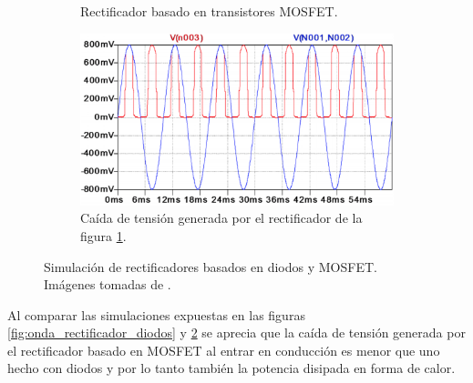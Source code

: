 \begin{figure}[h!]
\begin{subfigure}{.5\textwidth}
		\caption{Rectificador basado en transistores MOSFET.}
		\label{fig:rect_MOSFET}
	\end{subfigure}
	\begin{subfigure}{.5\textwidth}
		\centering
		\includegraphics[width=.8\linewidth]{Figures/onda_passive_mosfet_rectifier}  
		\caption{Caída de tensión generada por el rectificador de la figura \ref{fig:rect_MOSFET}.}
		\label{fig:onda_rectificador_MOSFET}
	\end{subfigure}
	\caption{Simulación de rectificadores basados en diodos y MOSFET. Imágenes tomadas de \citep{Yilmaz}.}
	\label{fig:comparacion_diodos_vs_MOSFET}
\end{figure}
Al comparar las simulaciones expuestas en las figuras \ref{fig:onda_rectificador_diodos} y \ref{fig:onda_rectificador_MOSFET} se aprecia que la caída de tensión generada por el rectificador basado en MOSFET al entrar en conducción es menor que uno hecho con diodos y por lo tanto también la potencia disipada en forma de calor.\\

